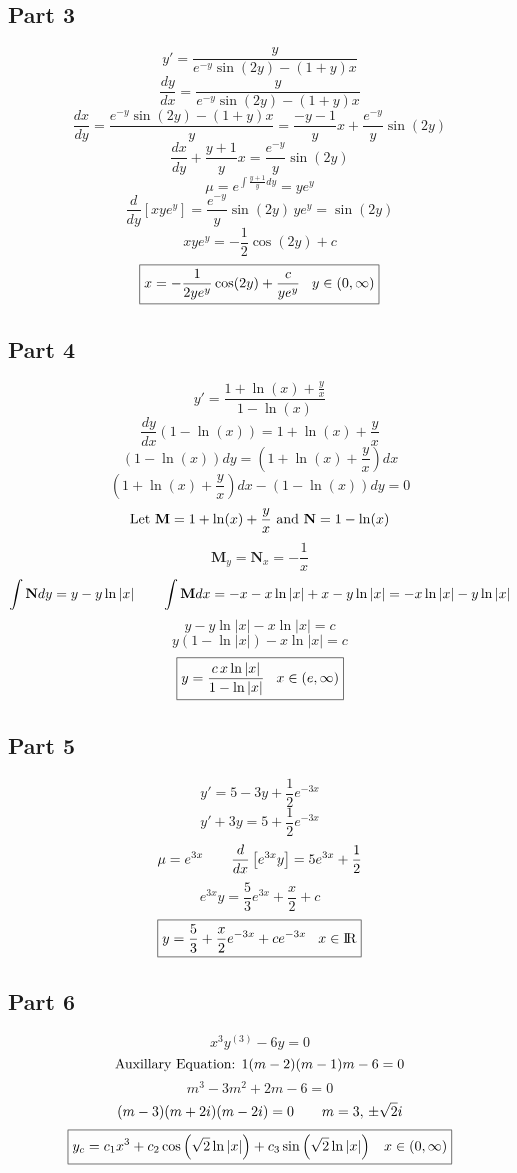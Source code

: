 \documentclass{article}
\begin{document}
\subsection*{Part 3}
\[y'=\frac{y}{e^{-y}\sin(2y)-(1+y)x}\]
\[\frac{dy}{dx}=\frac{y}{e^{-y}\sin(2y)-(1+y)x}\]
\[\frac{dx}{dy}=\frac{e^{-y}\sin(2y)-(1+y)x}{y}=\frac{-y-1}{y}x+\frac{e^{-y}}{y}\sin(2y)\]
\[\frac{dx}{dy}+\frac{y+1}{y}x=\frac{e^{-y}}{y}\sin(2y)\]
\[\mu=e^{\int\frac{y+1}{y}dy}=ye^y\]
\[\frac{d}{dy}\left[xye^y\right]=\frac{e^{-y}}{y}\sin(2y)\,ye^y=\sin(2y)\]
\[xye^y=-\frac{1}{2}\cos(2y)+c\]
\[\boxed{x=-\frac{1}{2ye^y}\cos(2y)+\frac{c}{ye^y}\hspace{3 mm}y\in(0,\infty)}\]
\subsection*{Part 4}
\[y'=\frac{1+\ln(x)+\frac{y}{x}}{1-\ln(x)}\]
\[\frac{dy}{dx}(1-\ln(x))=1+\ln(x)+\frac{y}{x}\]
\[(1-\ln(x))dy=\left(1+\ln(x)+\frac{y}{x}\right)dx\]
\[\left(1+\ln(x)+\frac{y}{x}\right)dx-(1-\ln(x))dy=0\]
\[\textnormal{Let } \textbf{M}=1+\ln(x)+\frac{y}{x} \textnormal{ and } \textbf{N}=1-\ln(x)\]
\[\textbf{M}_y=\textbf{N}_x=-\frac{1}{x}\]
\[\int\textbf{N}dy=y-y\ln|x|\hspace{7 mm}\int\textbf{M}dx=-x-x\ln|x|+x-y\ln|x|=-x\ln|x|-y\ln|x|\]
\[y-y\ln|x|-x\ln|x|=c\]
\[y(1-\ln|x|)-x\ln|x|=c\]
\[\boxed{y=\frac{c\,x\ln|x|}{1-\ln|x|}\hspace{3 mm}x\in(e,\infty)}\]
\subsection*{Part 5}
\[y'=5-3y+\frac{1}{2}e^{-3x}\]
\[y'+3y=5+\frac{1}{2}e^{-3x}\]
\[\mu=e^{3x}\hspace{7 mm}\frac{d}{dx}\left[e^{3x}y\right]=5e^{3x}+\frac{1}{2}\]
\[e^{3x}y=\frac{5}{3}e^{3x}+\frac{x}{2}+c\]
\[\boxed{y=\frac{5}{3}+\frac{x}{2}e^{-3x}+ce^{-3x}\hspace{3 mm}x\in{\rm I\!R}}\]
\subsection*{Part 6}
\[x^3y^{(3)}-6y=0\]
\[\textnormal{Auxillary Equation: }1(m-2)(m-1)m-6=0\]
\[m^3-3m^2+2m-6=0\]
\[(m-3)(m+2i)(m-2i)=0\hspace{7 mm}m=3,\,\pm\sqrt{2}i\]
\[\boxed{y_c=c_1x^3+c_2\cos\left(\sqrt{2}\ln|x|\right)+c_3\sin\left(\sqrt{2}\ln|x|\right)\hspace{3 mm}x\in(0,\infty)}\]
\newpage
\end{document}
